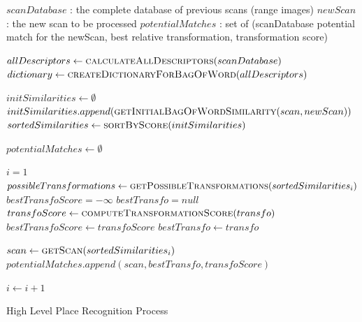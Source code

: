 \begin{algorithm}
    \begin{algorithmic}[1]
        \INPUT
        \Statex $scanDatabase$ : the complete database of previous scans (range images)
        \Statex $newScan$ : the new scan to be processed
        \OUTPUT
        \Statex $potentialMatches$ : set of (scanDatabase potential match for the newScan, best relative transformation, transformation score)
        \Statex

        \State $allDescriptors \gets \textsc{calculateAllDescriptors}(scanDatabase)$
        \State $dictionary \gets \textsc{createDictionaryForBagOfWord}(allDescriptors)$

        \State
        \State $initSimilarities \gets \emptyset$ 
        \State $initSimilarities.append(\textsc{getInitialBagOfWordSimilarity}(scan, newScan))$
        \EndFor
        \State $sortedSimilarities \gets \textsc{sortByScore}(initSimilarities)$

        \State
        \State $potentialMatches \gets \emptyset$

        \State $i = 1$
        \State $possibleTransformations \gets \textsc{getPossibleTransformations}(sortedSimilarities_i)$
        \State
        \State $bestTransfoScore = -\infty$
        \State $bestTransfo = null$
        \State $transfoScore \gets \textsc{computeTransformationScore}(transfo)$
        \State
        \State $bestTransfoScore \gets transfoScore$
        \State $bestTransfo \gets transfo$
        \EndIf
        \EndIf
        \EndFor

        \State
        \State $scan \gets \textsc{getScan}(sortedSimilarities_i)$
        \State $potentialMatches.append(scan, bestTransfo, transfoScore)$
        \EndIf

        \State
        \State $i \gets i+1$
        \EndWhile

        \State
        \State {}
        \EndFunction
    \end{algorithmic}

    \caption{High Level Place Recognition Process}
    \label{alg:chap_slam_overview}
\end{algorithm}

